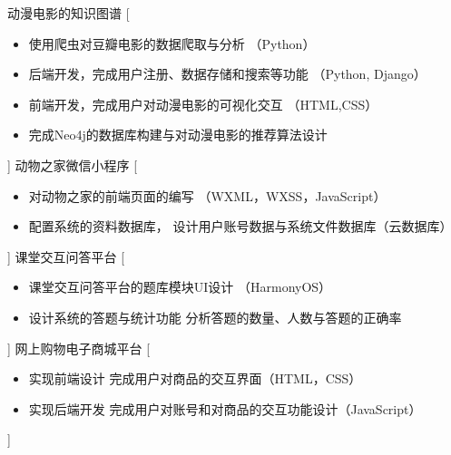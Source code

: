 \documentclass[zh]{resume}
\begin{document}
\begin{experiences}
    {动漫电影的知识图谱}%
    [\begin{itemize}
      \item 使用爬虫对豆瓣电影的数据爬取与分析
      （Python）
      \item 后端开发，完成用户注册、数据存储和搜索等功能
      （Python, Django）
      \item 前端开发，完成用户对动漫电影的可视化交互
      （HTML,CSS）
      \item 完成Neo4j的数据库构建与对动漫电影的推荐算法设计
    \end{itemize}]
  \separator{0.5ex}
    {动物之家微信小程序}%
    [\begin{itemize}
      \item 对动物之家的前端页面的编写
        （WXML，WXSS，JavaScript）
      \item 配置系统的资料数据库，
         设计用户账号数据与系统文件数据库（云数据库）
    \end{itemize}]
  \separator{0.5ex}
  \experience%
    [2023.10]%
    {}%
    {课堂交互问答平台}%
    [\begin{itemize}
      \item 课堂交互问答平台的题库模块UI设计
        （HarmonyOS）
      \item 设计系统的答题与统计功能
         分析答题的数量、人数与答题的正确率
    \end{itemize}]
  \separator{0.5ex}
  \experience%
    [2023.09]%
    {}%
    {网上购物电子商城平台}%
    [\begin{itemize}
      \item 实现前端设计
        完成用户对商品的交互界面（HTML，CSS）
      \item 实现后端开发
         完成用户对账号和对商品的交互功能设计（JavaScript）
    \end{itemize}]
\end{experiences}
\end{document}
